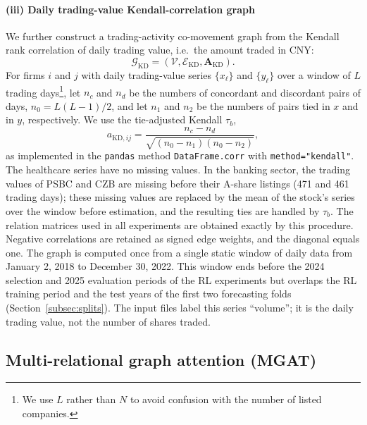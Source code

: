 \documentclass[pdflatex,sn-mathphys-num]{sn-jnl}%
\theoremstyle{thmstyleone}%
\theoremstyle{thmstyletwo}%
\theoremstyle{thmstylethree}%
\begin{document}
\paragraph{(iii) Daily trading-value Kendall-correlation graph}
{\color{blue}We further construct a trading-activity co-movement graph from the Kendall rank correlation of daily trading value, i.e.\ the amount traded in CNY:
\begin{equation}
\mathcal{G}_{\mathrm{KD}}=(\mathcal{V},\mathcal{E}_{\mathrm{KD}},\mathbf{A}_{\mathrm{KD}}).
\end{equation}
For firms $i$ and $j$ with daily trading-value series $\{x_\ell\}$ and $\{y_\ell\}$ over a window of $L$ trading days\footnote{We use $L$ rather than $N$ to avoid confusion with the number of listed companies.}, let $n_c$ and $n_d$ be the numbers of concordant and discordant pairs of days, $n_0=L(L-1)/2$, and let $n_1$ and $n_2$ be the numbers of pairs tied in $x$ and in $y$, respectively. We use the tie-adjusted Kendall $\tau_b$,
\begin{equation}
a_{\mathrm{KD},ij}=\frac{n_c-n_d}{\sqrt{(n_0-n_1)(n_0-n_2)}},
\label{eq:kendall_def}
\end{equation}
as implemented in the \texttt{pandas} method \texttt{DataFrame.corr} with \texttt{method="kendall"}. The healthcare series have no missing values. In the banking sector, the trading values of PSBC and CZB are missing before their A-share listings (471 and 461 trading days); these missing values are replaced by the mean of the stock's series over the window before estimation, and the resulting ties are handled by $\tau_b$. The relation matrices used in all experiments are obtained exactly by this procedure. Negative correlations are retained as signed edge weights, and the diagonal equals one. The graph is computed once from a single static window of daily data from January 2, 2018 to December 30, 2022. This window ends before the 2024 selection and 2025 evaluation periods of the RL experiments but overlaps the RL training period and the test years of the first two forecasting folds (Section~\ref{subsec:splits}). The input files label this series ``volume''; it is the daily trading value, not the number of shares traded.\par}

\subsection{Multi-relational graph attention (MGAT)}\label{subsec3}
\end{document}
